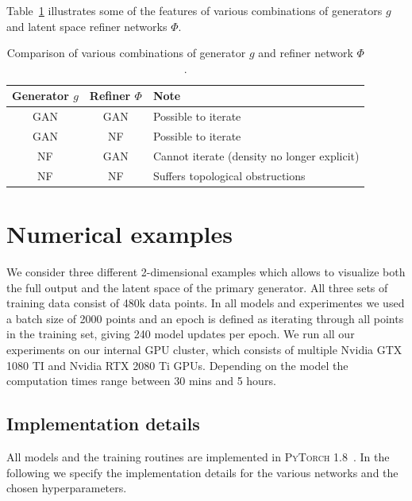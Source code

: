 Table~\ref{tab:refiner_comparison} illustrates some of the features of various combinations of generators $g$ and latent space refiner networks $\Phi$.

\begin{table}[!htbp]
  \caption{Comparison of various combinations of generator $g$ and refiner network $\Phi$.}
  \label{tab:refiner_comparison}
  \centering
  \begin{tabular}{ccl}
    \toprule
      \parbox{2cm}{\centering Generator $g$} & \parbox{2cm}{\centering Refiner $\Phi$} & \parbox{5cm}{Note}\\
    \midrule
     GAN & GAN &  Possible to iterate \\
     GAN & NF &  Possible to iterate \\
     NF & GAN &  Cannot iterate (density no longer explicit)\\
     NF & NF &  Suffers topological obstructions \\
    \bottomrule
  \end{tabular}
\end{table}

\section{Numerical examples}
\label{sec:examples}

We consider three different 2-dimensional examples which allows to visualize both the full output and the latent space of the primary generator.
All three sets of training data consist of 480k data points. In all models and experimentes we used a batch size of 2000 points and an epoch is defined as iterating through all points in the training set, giving 240 model updates per epoch. We run all our experiments on
our internal GPU cluster, which consists of multiple Nvidia GTX 1080 TI and Nvidia RTX 2080 Ti GPUs. Depending on the model the computation times range between 30 mins and 5 hours.

\subsection{Implementation details}
\label{sec:implementation_details}

All models and the training routines are implemented in \textsc{PyTorch} 1.8~\cite{Pytorch2019}. In the following we specify the implementation details for the various networks and the chosen hyperparameters.

